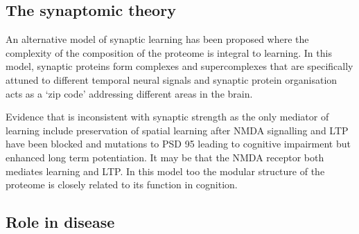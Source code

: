  
\subsection{The synaptomic theory}

An alternative model of synaptic learning has been proposed where the complexity of the composition of the proteome is integral to learning\cite{grant2019synapse}. In this model, synaptic proteins form complexes and supercomplexes that are specifically attuned to different temporal neural signals and synaptic protein organisation acts as a `zip code' addressing different areas in the brain\cite{grant2018synaptomic}.

Evidence that is inconsistent with synaptic strength as the only mediator of learning\cite{grant2019synapse} include preservation of spatial learning after NMDA signalling and LTP have been blocked\cite{bannerman2014hippocampal} and mutations to PSD 95 leading to cognitive impairment but enhanced long term potentiation\cite{nithianantharajah2013synaptic}. It may be that the NMDA receptor both mediates learning and LTP\cite{grant2019synapse}. In this model too the modular structure of the proteome is closely related to its function in cognition. 



\subsection{Role in disease}
 
